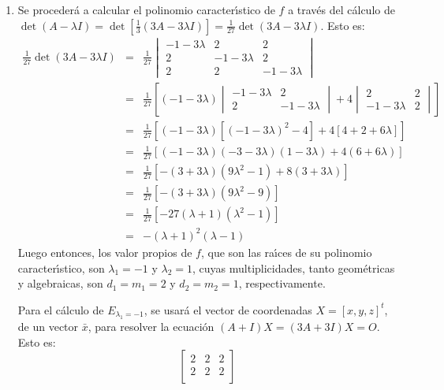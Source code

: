 \begin{solucion}
\begin{enumerate}
  \item Se proceder\'a a calcular el polinomio caracter\'{\i}stico de $f$ a trav\'es del c\'alculo de $\det(A - \lambda I) = \det\left[ \frac{1}{3}(3A - 3\lambda I) \right] = \frac{1}{27}\det(3A - 3\lambda I)$. Esto es:
  \begin{eqnarray*}
   \frac{1}{27}\det(3A-3\lambda I) & = &
   \frac{1}{27}
   \begin{vmatrix}
    -1 - 3\lambda & 2 & 2 \\
    2 & -1 - 3\lambda & 2 \\
    2 & 2 & -1 - 3\lambda
   \end{vmatrix} \\
   & = & \frac{1}{27}
   \left[
   (-1 - 3\lambda)
   \begin{vmatrix}
    -1 - 3\lambda & 2 \\
    2 & - 1 - 3\lambda 
   \end{vmatrix}
   + 4
   \begin{vmatrix}
    2 & 2 \\
    -1-3\lambda & 2 
   \end{vmatrix}
   \right] \\
   & = & 
   \frac{1}{27}\left[ (-1-3\lambda)[(-1-3\lambda)^2 - 4]+ 4[4 + 2+6\lambda] \right] \\
   & = & \frac{1}{27}\left[ (-1-3\lambda)(-3-3\lambda)(1-3\lambda) + 4(6+6\lambda) \right] \\
   & = & \frac{1}{27}\left[ -(3+3\lambda)(9\lambda^2 - 1) + 8(3+3\lambda) \right] \\
   & = & \frac{1}{27}\left[ -(3+3\lambda)(9\lambda^2 - 9) \right] \\
   & = & \frac{1}{27}\left[-27(\lambda+1)(\lambda^2-1)\right] \\ 
   & = & -(\lambda + 1)^2(\lambda-1)
  \end{eqnarray*}
  Luego entonces, los valor propios de $f$, que son las ra\'{\i}ces de su polinomio caracter\'{\i}stico, son $\lambda_1 = -1$ y $\lambda_2 = 1$, cuyas multiplicidades, tanto geom\'etricas y algebraicas, son $d_1 = m_1 = 2$ y $d_2 = m_2 = 1$, respectivamente.
  \par
  Para el c\'alculo de $E_{\lambda_1 = -1}$, se usar\'a el vector de coordenadas $X = [x,y,z]^t$, de un vector $\bar{x}$, para resolver la ecuaci\'on $(A + I)X = (3A+3I)X = O$. Esto es:
  \begin{equation*}
   \begin{bmatrix}
    2 & 2 & 2 \\
    2 & 2 & 2 \\

\end{bmatrix}
\end{equation*}
\end{enumerate}
\end{solucion}
